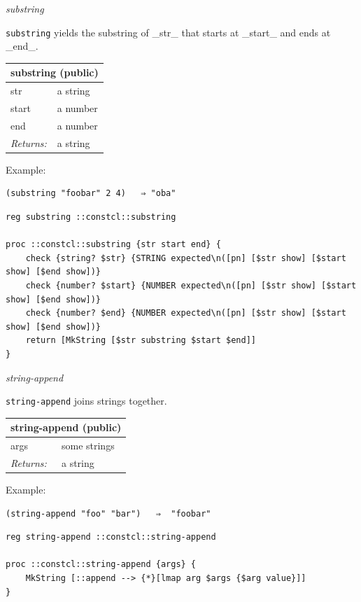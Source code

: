 \documentclass[twoside,9pt]{report}
\begin{document}
\emph{substring}


\texttt{substring} yields the substring of \_str\_ that starts at \_start\_ and ends at \_end\_.

\begin{tabular}{ |l l| }
\hline
\multicolumn{2}{|l|}{substring (public)} \\
\hline
str & a string \\
start & a number \\
end & a number \\
\textit{Returns:} & a string \\
\hline
\end{tabular}


Example:

\noindent\makebox[\linewidth]{\rule{\linewidth}{0.4pt}}
\begin{lstlisting}
(substring "foobar" 2 4)   ⇒ "oba"
\end{lstlisting}
\noindent\makebox[\linewidth]{\rule{\linewidth}{0.4pt}}
\noindent\makebox[\linewidth]{\rule{\linewidth}{0.4pt}}
\begin{lstlisting}
reg substring ::constcl::substring
 
proc ::constcl::substring {str start end} {
    check {string? $str} {STRING expected\n([pn] [$str show] [$start show] [$end show])}
    check {number? $start} {NUMBER expected\n([pn] [$str show] [$start show] [$end show])}
    check {number? $end} {NUMBER expected\n([pn] [$str show] [$start show] [$end show])}
    return [MkString [$str substring $start $end]]
}
\end{lstlisting}
\noindent\makebox[\linewidth]{\rule{\linewidth}{0.4pt}}

\emph{string-append}


\texttt{string-append} joins strings together.

\begin{tabular}{ |l l| }
\hline
\multicolumn{2}{|l|}{string-append (public)} \\
\hline
args & some strings \\
\textit{Returns:} & a string \\
\hline
\end{tabular}


Example:

\noindent\makebox[\linewidth]{\rule{\linewidth}{0.4pt}}
\begin{lstlisting}
(string-append "foo" "bar")   ⇒  "foobar"
\end{lstlisting}
\noindent\makebox[\linewidth]{\rule{\linewidth}{0.4pt}}
\noindent\makebox[\linewidth]{\rule{\linewidth}{0.4pt}}
\begin{lstlisting}
reg string-append ::constcl::string-append
 
proc ::constcl::string-append {args} {
    MkString [::append --> {*}[lmap arg $args {$arg value}]]
}
\end{lstlisting}
\noindent\makebox[\linewidth]{\rule{\linewidth}{0.4pt}}
\end{document}

